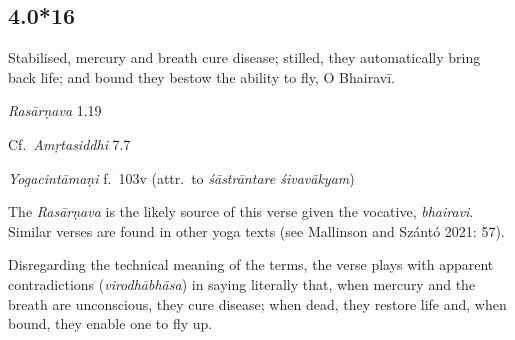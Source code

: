 \begin{ekdosis}

\subsection*{4.0*16}
\begin{translation}[hp04_000_16]
Stabilised, mercury and breath cure disease; stilled, they automatically bring back life; and bound they bestow the ability to fly, O Bhairavī.
\end{translation}

\begin{sources}[hp04_000_16]
\emph{Rasārṇava} 1.19
\begin{versinnote}
\end{versinnote}

Cf.~\emph{Amṛtasiddhi} 7.7
\begin{versinnote}
\end{versinnote}
\end{sources}

\begin{testimonia}[hp04_000_16]
\emph{Yogacintāmaṇi} f.~103v (attr.~to \emph{śāstrāntare śivavākyam})
\begin{versinnote}
\end{versinnote}
\end{testimonia}

\begin{philcomm}[hp04_000_16]
The \emph{Rasārṇava} is the likely source of this verse given the vocative, \emph{bhairavi}. Similar verses are found in other yoga texts (see Mallinson and Szántó 2021: 57).\lb

Disregarding the technical meaning of the terms, the verse plays with apparent contradictions (\emph{virodhābhāsa}) in saying literally that, when mercury and the breath are unconscious, they cure disease; when dead, they restore life and, when bound, they enable one to fly up.
\end{philcomm}


\end{ekdosis}
